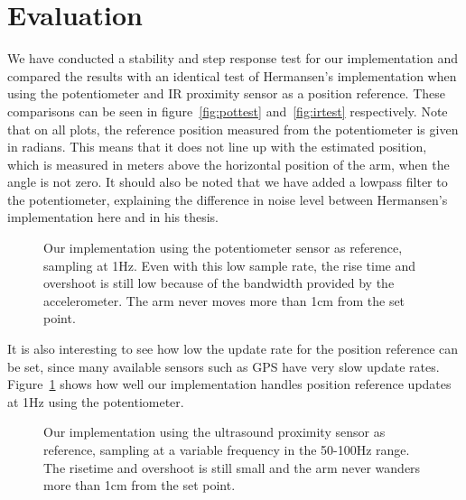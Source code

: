 \begin{figure*}
	\centering
	\subfloat[][]{\setlength\figureheight{4cm}
		\setlength\figurewidth{6cm}
		
	}
	\subfloat[][]{\setlength\figureheight{4cm}
		\setlength\figurewidth{6cm}
		
	}
	\caption{(a): Our implementation using the IR proximity sensor as reference, sampling at \(\sim\)20Hz versus (b): 
	Hermansens's implementation using the IR proximity sensor as reference, sampling at 200Hz. For (a) the slow variations in 
altitude are a result of the measurements from the IR proximity sensor being quantized in 2cm steps giving the arm
free reign to drift within that range. The noise in (b) is not measurement noise, but rapid oscillation.}
\label{fig:irtest}
\vspace{3pt}
\hrulefill
\end{figure*}
\section{Evaluation}\label{sec:evaluation}
We have conducted a stability and step response test for our implementation and compared the results with an identical test of
Hermansen's implementation when using the potentiometer and IR proximity sensor as a position reference. These comparisons can be
seen in figure~\ref{fig:pottest} and~\ref{fig:irtest} respectively. Note that on all plots, the reference position measured from the
potentiometer is given in radians. This means that it does not line up with the estimated position, which is measured in meters above
the horizontal position of the arm, when the angle is not zero. It should also be noted that we have added a lowpass filter to the
potentiometer, explaining the difference in noise level between Hermansen's implementation here and in his thesis.
\begin{figure}
	\setlength\figureheight{4cm}
	\setlength\figurewidth{6cm}
	
	\caption{Our implementation using the potentiometer sensor as reference, sampling at 1Hz. Even with this low sample rate, the
		rise time and overshoot is still low because of the bandwidth provided by the accelerometer. The arm never moves more than
		1cm from the set point.}
\label{fig:pot1hztest}
\end{figure}

It is also interesting to see how low the update rate for the position reference can be set, since many available sensors such as GPS 
have very slow update rates. Figure~\ref{fig:pot1hztest} shows how well our implementation handles position reference updates at
1Hz using the potentiometer.
\begin{figure}
	\setlength\figureheight{4cm}
	\setlength\figurewidth{6cm}
	
	\caption{Our implementation using the ultrasound proximity sensor as reference, sampling at a variable frequency in the 50-100Hz 
	range. The risetime and overshoot is still small and the arm never wanders more than 1cm from the set point.}
\label{fig:ultratest}
\end{figure}


